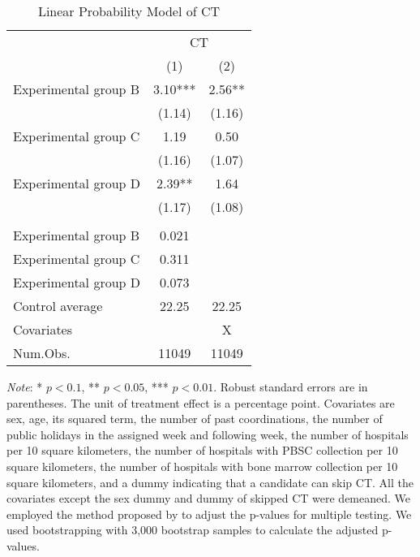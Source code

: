 \documentclass[12pt, a4paper]{article}
\begin{document}
\begin{table}

\caption{\label{tab:lm-test}Linear Probability Model of CT}
\centering
\fontsize{8}{10}\selectfont
\begin{threeparttable}
\begin{tabular}[t]{>{\raggedright\arraybackslash}p{20em}cc}
\toprule
\multicolumn{1}{c}{ } & \multicolumn{2}{c}{CT} \\
\cmidrule(l{3pt}r{3pt}){2-3}
  & (1) & (2)\\
\midrule
Experimental group B & \num{3.10}*** & \num{2.56}**\\
 & (\num{1.14}) & (\num{1.16})\\
Experimental group C & \num{1.19} & \num{0.50}\\
 & (\num{1.16}) & (\num{1.07})\\
Experimental group D & \num{2.39}** & \num{1.64}\\
 & (\num{1.17}) & (\num{1.08})\\
\midrule
\addlinespace[0.3em]
\multicolumn{3}{l}{\textit{Adjustment of p-values for multiple testing}}\\
\hspace{1em}Experimental group B & 0.021 & \\
\hspace{1em}Experimental group C & 0.311 & \\
\hspace{1em}Experimental group D & 0.073 & \\
Control average & 22.25 & 22.25\\
Covariates &  & X\\
Num.Obs. & \num{11049} & \num{11049}\\
\bottomrule
\end{tabular}
\begin{tablenotes}
\item \emph{Note}: * $p < 0.1$, ** $p < 0.05$, *** $p < 0.01$. Robust standard errors are in parentheses. The unit of treatment effect is a percentage point. Covariates are sex, age, its squared term, the number of past coordinations, the number of public holidays in the assigned week and following week, the number of hospitals per 10 square kilometers, the number of hospitals with PBSC collection per 10 square kilometers, the number of hospitals with bone marrow collection per 10 square kilometers, and a dummy indicating that a candidate can skip CT. All the covariates except the sex dummy and dummy of skipped CT were demeaned. We employed the method proposed by \citet{List2019} to adjust the p-values for multiple testing. We used bootstrapping with 3,000 bootstrap samples to calculate the adjusted p-values.
\end{tablenotes}
\end{threeparttable}
\end{table}
\end{document}
